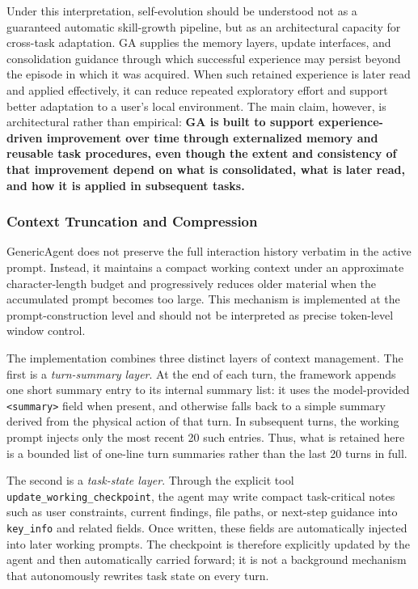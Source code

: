 Under this interpretation, self-evolution should be understood not as a guaranteed automatic skill-growth pipeline, but as an architectural capacity for cross-task adaptation. GA supplies the memory layers, update interfaces, and consolidation guidance through which successful experience may persist beyond the episode in which it was acquired. When such retained experience is later read and applied effectively, it can reduce repeated exploratory effort and support better adaptation to a user's local environment. The main claim, however, is architectural rather than empirical: \textbf{GA is built to support experience-driven improvement over time through externalized memory and reusable task procedures, even though the extent and consistency of that improvement depend on what is consolidated, what is later read, and how it is applied in subsequent tasks.}

\subsubsection{Context Truncation and Compression}
\label{sec:context_truncation_compression}

GenericAgent does not preserve the full interaction history verbatim in the active prompt. Instead, it maintains a compact working context under an approximate character-length budget and progressively reduces older material when the accumulated prompt becomes too large. This mechanism is implemented at the prompt-construction level and should not be interpreted as precise token-level window control.

The implementation combines three distinct layers of context management. The first is a \emph{turn-summary layer}. At the end of each turn, the framework appends one short summary entry to its internal summary list: it uses the model-provided \texttt{<summary>} field when present, and otherwise falls back to a simple summary derived from the physical action of that turn. In subsequent turns, the working prompt injects only the most recent 20 such entries. Thus, what is retained here is a bounded list of one-line turn summaries rather than the last 20 turns in full.

The second is a \emph{task-state layer}. Through the explicit tool \texttt{update\_working\_checkpoint}, the agent may write compact task-critical notes such as user constraints, current findings, file paths, or next-step guidance into \texttt{key\_info} and related fields. Once written, these fields are automatically injected into later working prompts. The checkpoint is therefore explicitly updated by the agent and then automatically carried forward; it is not a background mechanism that autonomously rewrites task state on every turn.

